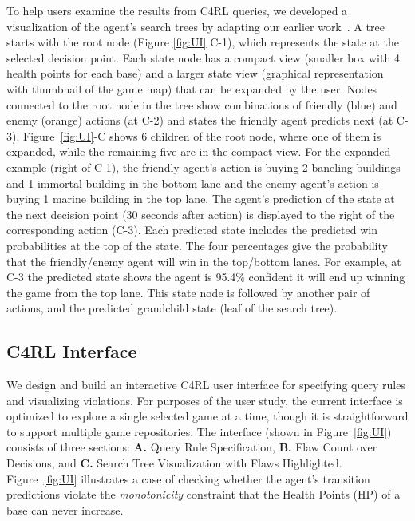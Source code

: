 \documentclass[letterpaper]{article} %
\begin{document}
To help users examine the results from C4RL queries, we developed a visualization of the agent's search trees by adapting our earlier work~\cite{khanna2022finding,tabatabai2021did}.
A tree starts with the root node (Figure \ref{fig:UI} C-1), which represents the state at the selected decision point.
Each state node has a compact view (smaller box with 4 health points for each base) and a larger state view (graphical representation with thumbnail of the game map) that can be expanded by the user.
Nodes connected to the root node in the tree show combinations of friendly (blue) and enemy (orange) actions (at C-2) and states the friendly agent predicts next (at C-3).
Figure~\ref{fig:UI}-C shows 6 children of the root node, where  one of them is expanded, while the remaining five are in the compact view.  
For the expanded example (right of C-1), the friendly agent's action is buying 2 baneling buildings and 1 immortal building in the bottom lane and the enemy agent's action is buying 1 marine building in the top lane. 
The agent's prediction of the state at the next decision point (30 seconds after action) is displayed to the right of the corresponding action (C-3). Each predicted state includes the predicted win probabilities at the top of the state. The four percentages give the probability that the friendly/enemy agent will win in the top/bottom lanes. For example, at C-3 the predicted state shows the agent is 95.4\% confident it will end up winning the game from the top lane.
This state node is followed by another pair of actions, and the predicted grandchild state (leaf of the search tree). 

\subsection{C4RL Interface}

We design and build an interactive C4RL user interface for specifying query rules and visualizing violations.
For purposes of the user study, the current interface is optimized to explore a single selected game at a time, though it is straightforward to support multiple game repositories. 
The interface (shown in Figure~\ref{fig:UI}) consists of three sections: \textbf{A.} Query Rule Specification, \textbf{B.} Flaw Count over Decisions, and \textbf{C.} Search Tree Visualization with Flaws Highlighted.
Figure~\ref{fig:UI} illustrates a case of checking whether the agent's transition predictions violate the \textit{monotonicity} constraint that the Health Points (HP) of a base can never increase. 
\end{document}

